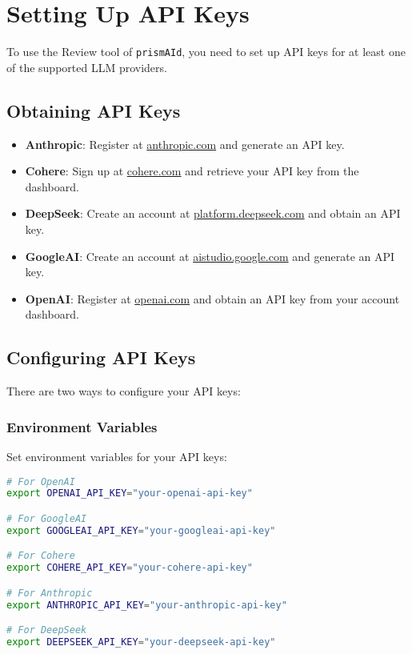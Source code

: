 \section{Setting Up API Keys}

To use the Review tool of \texttt{prismAId}, you need to set up API keys for at least one of the supported LLM providers.

\subsection{Obtaining API Keys}

\begin{itemize}
    \item \textbf{Anthropic}: Register at \href{https://www.anthropic.com/}{anthropic.com} and generate an API key.
    \item \textbf{Cohere}: Sign up at \href{https://cohere.com/}{cohere.com} and retrieve your API key from the dashboard.
    \item \textbf{DeepSeek}: Create an account at \href{https://platform.deepseek.com/}{platform.deepseek.com} and obtain an API key.
    \item \textbf{GoogleAI}: Create an account at \href{https://aistudio.google.com}{aistudio.google.com} and generate an API key.
    \item \textbf{OpenAI}: Register at \href{https://www.openai.com/}{openai.com} and obtain an API key from your account dashboard.
\end{itemize}

\subsection{Configuring API Keys}

There are two ways to configure your API keys:

\subsubsection{Environment Variables}

Set environment variables for your API keys:

\begin{commandbox}
\begin{lstlisting}[language=Bash]
# For OpenAI
export OPENAI_API_KEY="your-openai-api-key"

# For GoogleAI
export GOOGLEAI_API_KEY="your-googleai-api-key"

# For Cohere
export COHERE_API_KEY="your-cohere-api-key"

# For Anthropic
export ANTHROPIC_API_KEY="your-anthropic-api-key"

# For DeepSeek
export DEEPSEEK_API_KEY="your-deepseek-api-key"
\end{lstlisting}
\end{commandbox}

